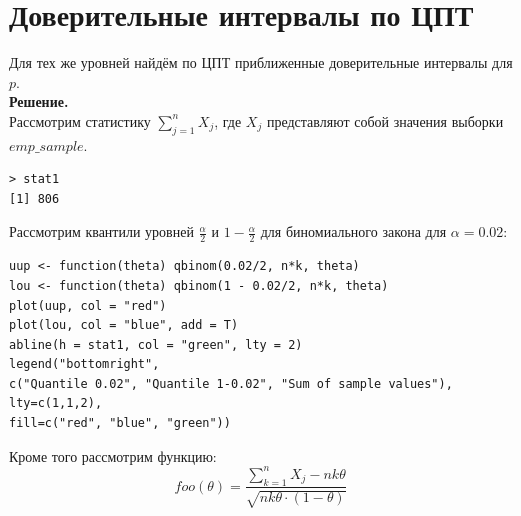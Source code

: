 \documentclass[14pt,a4paper]{scrartcl}
\begin{document}
\section{Доверительные интервалы по ЦПТ}\label{sec2}
Для тех же уровней найдём по ЦПТ приближенные доверительные интервалы для $p$.\\
\textbf{Решение.}\\
Рассмотрим статистику $\sum_{j=1}^{n}X_j$, где $X_j$ представляют собой значения выборки $emp\_sample$.
\begin{verbatim}
> stat1
[1] 806
\end{verbatim}
Рассмотрим квантили уровней $\frac{\alpha}{2}$ и $1 - \frac{\alpha}{2}$ для биномиального закона для $\alpha = 0.02$:
\begin{verbatim}
uup <- function(theta) qbinom(0.02/2, n*k, theta)
lou <- function(theta) qbinom(1 - 0.02/2, n*k, theta)
plot(uup, col = "red")
plot(lou, col = "blue", add = T)
abline(h = stat1, col = "green", lty = 2)
legend("bottomright", 
c("Quantile 0.02", "Quantile 1-0.02", "Sum of sample values"), 
lty=c(1,1,2), 
fill=c("red", "blue", "green"))
\end{verbatim}

Кроме того рассмотрим функцию:
\begin{equation*}
foo(\theta)=\frac{\sum\limits_{k=1}^{n} X_{j}-nk \theta}{\sqrt{nk \theta \cdot(1-\theta)}}
\end{equation*}
 \pagebreak

\begin{figure}[h]
\end{figure}
\begin{figure}[h]
\end{figure}
\end{document}
